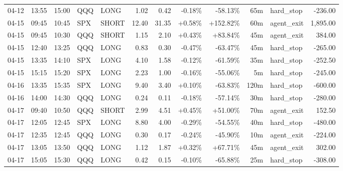 \documentclass[11pt,a4paper,twoside]{article}
\begin{document}
\begin{center}
\begin{longtable}{>{\color{txtmain}}l l l l l r r r r r >{\color{txtmain}}l r}
04-12 & 13:55 & 15:00 & QQQ & LONG & 1.02 & 0.42 & \textcolor{lossred}{-0.18\%} & \textcolor{lossred}{-58.13\%} & 65m & hard\_stop & \textcolor{lossred}{-236.00} \\
04-15 & 09:45 & 10:45 & SPX & SHORT & 12.40 & 31.35 & \textcolor{wingreen}{+0.58\%} & \textcolor{wingreen}{+152.82\%} & 60m & agent\_exit & \textcolor{wingreen}{1,895.00} \\
04-15 & 09:45 & 10:30 & QQQ & SHORT & 1.15 & 2.10 & \textcolor{wingreen}{+0.43\%} & \textcolor{wingreen}{+83.84\%} & 45m & agent\_exit & \textcolor{wingreen}{384.00} \\
04-15 & 12:40 & 13:25 & QQQ & LONG & 0.83 & 0.30 & \textcolor{lossred}{-0.47\%} & \textcolor{lossred}{-63.47\%} & 45m & hard\_stop & \textcolor{lossred}{-265.00} \\
04-15 & 13:35 & 14:10 & SPX & LONG & 4.10 & 1.58 & \textcolor{lossred}{-0.12\%} & \textcolor{lossred}{-61.59\%} & 35m & hard\_stop & \textcolor{lossred}{-252.50} \\
04-15 & 15:15 & 15:20 & SPX & LONG & 2.23 & 1.00 & \textcolor{lossred}{-0.16\%} & \textcolor{lossred}{-55.06\%} & 5m & hard\_stop & \textcolor{lossred}{-245.00} \\
04-16 & 13:35 & 15:35 & SPX & LONG & 9.40 & 3.40 & \textcolor{wingreen}{+0.10\%} & \textcolor{lossred}{-63.83\%} & 120m & hard\_stop & \textcolor{lossred}{-600.00} \\
04-16 & 14:00 & 14:30 & QQQ & LONG & 0.24 & 0.11 & \textcolor{lossred}{-0.18\%} & \textcolor{lossred}{-57.14\%} & 30m & hard\_stop & \textcolor{lossred}{-280.00} \\
04-17 & 09:40 & 10:50 & QQQ & SHORT & 2.99 & 4.51 & \textcolor{wingreen}{+0.45\%} & \textcolor{wingreen}{+51.00\%} & 70m & agent\_exit & \textcolor{wingreen}{152.50} \\
04-17 & 12:05 & 12:45 & SPX & LONG & 8.80 & 4.00 & \textcolor{lossred}{-0.29\%} & \textcolor{lossred}{-54.55\%} & 40m & hard\_stop & \textcolor{lossred}{-480.00} \\
04-17 & 12:35 & 12:45 & QQQ & LONG & 0.30 & 0.17 & \textcolor{lossred}{-0.24\%} & \textcolor{lossred}{-45.90\%} & 10m & agent\_exit & \textcolor{lossred}{-224.00} \\
04-17 & 13:05 & 13:50 & QQQ & LONG & 1.12 & 1.87 & \textcolor{wingreen}{+0.32\%} & \textcolor{wingreen}{+67.71\%} & 45m & agent\_exit & \textcolor{wingreen}{302.00} \\
04-17 & 15:05 & 15:30 & QQQ & LONG & 0.42 & 0.15 & \textcolor{lossred}{-0.10\%} & \textcolor{lossred}{-65.88\%} & 25m & hard\_stop & \textcolor{lossred}{-308.00} \\

\end{longtable}
\end{center}
\end{document}

